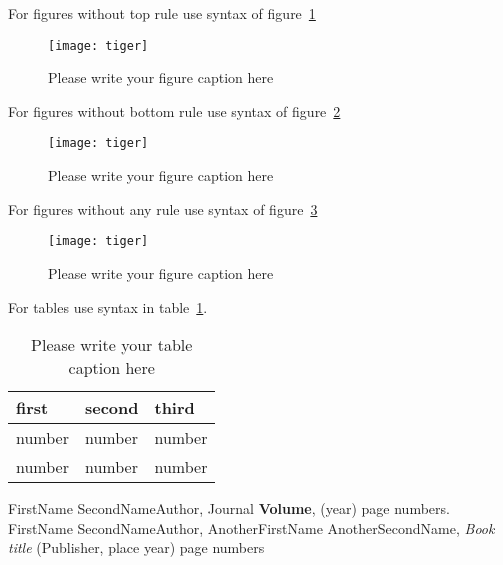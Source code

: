 \documentclass{ifpen-ogst}
\begin{document}
For figures without top rule use syntax of figure~\ref{fig-3}
\begin{figure}
\notoprule
\texttt{[image: tiger]}
\caption{Please write your figure caption here}
\label{fig-3}       %
\end{figure}

For figures without bottom rule use syntax of figure~\ref{fig-4}
\begin{figure}
\nobottomrule
\texttt{[image: tiger]}
\caption{Please write your figure caption here}
\label{fig-4}       %
\end{figure}

For figures without any rule use syntax of figure~\ref{fig-5}
\begin{figure}
\notoprule         %
\nobottomrule      %
\texttt{[image: tiger]}
\caption{Please write your figure caption here}
\label{fig-5}       %
\end{figure}

For tables use syntax in table~\ref{tab-1}.
\begin{table}
\caption{Please write your table caption here}
\label{tab-1}       %
\begin{tabular}{lll}
\hline
first & second & third  \\\hline
number & number & number \\
number & number & number \\\hline
\end{tabular}
\vspace*{5cm}  %
\end{table}
%
% 
%
%
\begin{thebibliography}{}
%
%
FirstName SecondNameAuthor, Journal \textbf{Volume}, (year) page numbers.
FirstName SecondNameAuthor, AnotherFirstName AnotherSecondName,
\textit{Book title} (Publisher, place year) page numbers
\end{thebibliography}
\end{document}
